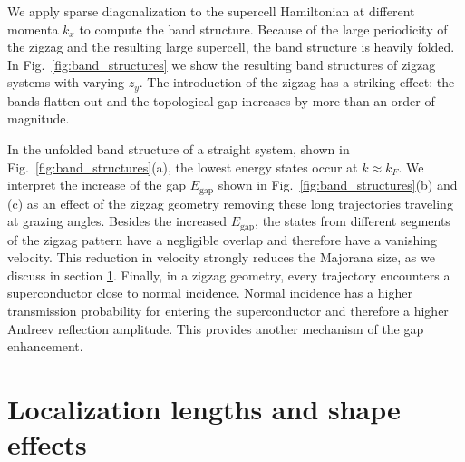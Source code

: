\documentclass[english, twocolumn, 10pt, aps, superscriptaddress, floatfix, prb, citeautoscript]{revtex4-1}
\renewcommand{\comment}[2]{#2}
\begin{document}
\comment{We calculate the band structure for varying amount of zigzag.}
We apply sparse diagonalization to the supercell Hamiltonian at different momenta $k_x$ to compute the band structure.
Because of the large periodicity of the zigzag and the resulting large supercell, the band structure is heavily folded.
In Fig.~\ref{fig:band_structures} we show the resulting band structures of zigzag systems with varying $z_y$.
The introduction of the zigzag has a striking effect: the bands flatten out and the topological gap increases by more than an order of magnitude.

\comment{Zigzag improves the gap and size because of cutting of trajectories and increasing transparency.}
In the unfolded band structure of a straight system, shown in Fig.~\ref{fig:band_structures}(a), the lowest energy states occur at $k \approx k_F$.
We interpret the increase of the gap $E_\textrm{gap}$ shown in Fig.~\ref{fig:band_structures}(b) and (c) as an effect of the zigzag geometry removing these long trajectories traveling at grazing angles.
Besides the increased $E_\textrm{gap}$, the states from different segments of the zigzag pattern have a negligible overlap and therefore have a vanishing velocity.
This reduction in velocity strongly reduces the Majorana size, as we discuss in section \ref{sec:shape_effects}.
Finally, in a zigzag geometry, every trajectory encounters a superconductor close to normal incidence.
Normal incidence has a higher transmission probability for entering the superconductor and therefore a higher Andreev reflection amplitude.
This provides another mechanism of the gap enhancement.


\section{Localization lengths and shape effects}\label{sec:shape_effects}
\end{document}
